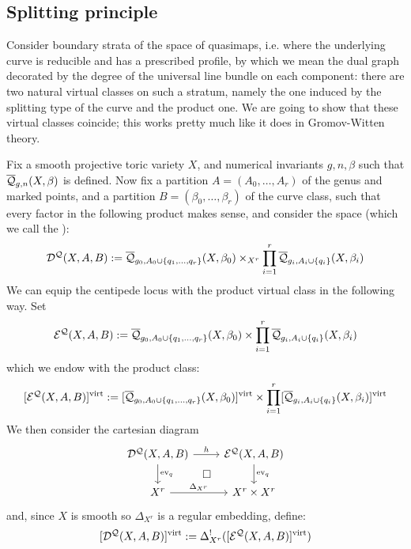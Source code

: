 \subsection{Splitting principle}

Consider boundary strata of the space of quasimaps, i.e. where the underlying curve is reducible and has a prescribed profile, by which we mean the dual graph decorated by the degree of the universal line bundle on each component: there are two natural virtual classes on such a stratum, namely the one induced by the splitting type of the curve and the product one. We are going to show that these virtual classes coincide; this works pretty much like it does in Gromov-Witten theory.

Fix a smooth projective toric variety $X$, and numerical invariants $g,n,\beta$ such that $\overline{\mathcal Q}_{g,n}(X,\beta)$ is defined. Now fix a partition $A=(A_0,\ldots,A_r)$ of the genus and marked points, and a partition $B=(\beta_0, \ldots, \beta_r)$ of the curve class, such that every factor in the following product makes sense, and consider the space (which we call the ):
\begin{equation*} \mathcal{D^Q}(X,A,B) := \overline{\mathcal Q}_{g_0,A_0 \cup \{ q_1, \ldots, q_r \}}(X,\beta_0) \times_{X^r} \prod_{i=1}^r \overline{\mathcal Q}_{g_i,A_i\cup\{q_i\}}(X,\beta_i) \end{equation*}
We can equip the centipede locus with the product virtual class in the following way. Set
\begin{equation*} \mathcal{E^Q}(X,A,B) :=  \overline{\mathcal Q}_{g_0,A_0 \cup \{ q_1, \ldots, q_r \}}(X,\beta_0) \times \prod_{i=1}^r \overline{\mathcal Q}_{g_i,A_i\cup\{q_i\}}(X,\beta_i) \end{equation*}
which we endow with the product class:
\begin{equation*} [\mathcal{E^Q}(X,A,B)]^{\operatorname{virt}} := [\overline{\mathcal Q}_{g_0,A_0 \cup \{ q_1, \ldots, q_r \}}(X,\beta_0)]^{\operatorname{virt}} \times \prod_{i=1}^r [\overline{\mathcal Q}_{g_i,A_i\cup\{q_i\}}(X,\beta_i)]^{\operatorname{virt}} \end{equation*}
We then consider the cartesian diagram
\begin{equation} \label{Product diagram}
\begin{tikzcd}
\D{X}{A}{B} \ar[r,"h"] \ar[d,"\ev_q"] \ar[rd,phantom,"\square"] & \E{X}{A}{B} \ar[d,"\ev_q"] \\
X^r \ar[r,"\Delta_{X^r}"] & X^r \times X^r
\end{tikzcd}
\end{equation}
and, since $X$ is smooth so $\Delta_{X^r}$ is a regular embedding, define:
\begin{equation*} [\mathcal{D^Q}(X,A,B)]^{\operatorname{virt}} := \Delta_{X^r}^! ([\mathcal{E^Q}(X,A,B)]^{\operatorname{virt}}) \end{equation*}
